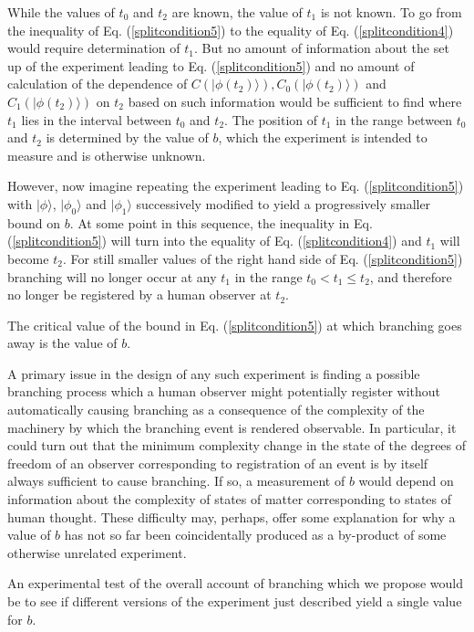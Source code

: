 \documentclass[12pt,amsmath,amssymb,onecolumn]{revtex4-2}
\begin{document}
While the values of $t_0$ and $t_2$ are known, the
value of $t_1$ is not known.
To go from the inequality of Eq. (\ref{splitcondition5})
to the equality of Eq. (\ref{splitcondition4}) would
require determination of $t_1$.
But no amount of information about the set up of
the experiment leading to Eq. (\ref{splitcondition5})
and no amount of calculation of the dependence of
$C( |\phi(t_2) \rangle ), C_0( |\phi(t_2) \rangle )$ and $C_1( |\phi(t_2) \rangle )$
on $t_2$
based on
such information would be sufficient to find where
$t_1$ lies in the interval between $t_0$ and $t_2$.
The position of $t_1$ in the
range between $t_0$ and $t_2$ is determined by
the value of $b$, which the experiment
is intended to measure and is otherwise unknown.

However, now imagine repeating the experiment leading
to Eq. (\ref{splitcondition5}) with
$|\phi \rangle $, $|\phi_0 \rangle $ and $|\phi_1 \rangle $ successively
modified to yield a progressively smaller
bound on $b$.
At some point in this
sequence, the inequality
in Eq. (\ref{splitcondition5})
will turn into the equality of
Eq. (\ref{splitcondition4})
and $t_1$ will become $t_2$.
For still smaller values
of the right hand side of Eq. (\ref{splitcondition5})
branching will no longer occur
at any $t_1$ in the range
$t_0 < t_1 \le t_2$, and therefore
no longer be registered by a human observer at $t_2$.

The critical
value of the bound in Eq. (\ref{splitcondition5})
at which branching goes away is the
value of $b$.


A primary issue in the design of any such
experiment is finding a possible branching process which a human
observer might potentially register without
automatically causing branching
as a consequence of the complexity of the machinery
by which the branching event is rendered observable.
In particular, it could turn out that
the minimum complexity change in the state
of the degrees of freedom of an observer
corresponding to registration of an event
is by itself always sufficient
to cause branching.
If so, a measurement of $b$
would depend on information
about the complexity
of states of matter
corresponding to states of human thought.
These difficulty may, perhaps,
offer some explanation for why a value
of $b$ has not so far been coincidentally
produced as a by-product of some otherwise
unrelated experiment.

An experimental test of the overall account of branching
which we propose would be to see if
different versions of the experiment
just described yield a single
value for $b$.
\end{document}
